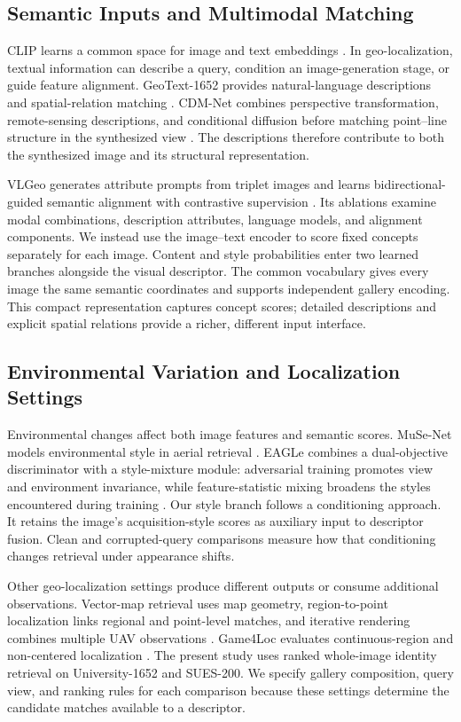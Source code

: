 \documentclass[journal]{IEEEtran}
\begin{document}
\subsection{Semantic Inputs and Multimodal Matching}

CLIP learns a common space for image and text embeddings \cite{clip2021}.
In geo-localization, textual information can describe a query, condition an
image-generation stage, or guide feature alignment. GeoText-1652 provides
natural-language descriptions and spatial-relation matching
\cite{geotext2024}. CDM-Net combines perspective transformation,
remote-sensing descriptions, and conditional diffusion before matching
point--line structure in the synthesized view \cite{cdmnet2025}. The
descriptions therefore contribute to both the synthesized image and its
structural representation.

VLGeo generates attribute prompts from triplet images and learns
bidirectional-guided semantic alignment with contrastive supervision
\cite{vlgeo2026}. Its ablations examine modal combinations, description
attributes, language models, and alignment components. We instead use the
image--text encoder to score fixed concepts separately for each image.
Content and style probabilities enter two learned branches alongside the
visual descriptor. The common vocabulary gives every image the same
semantic coordinates and supports independent gallery encoding. This
compact representation captures concept scores; detailed descriptions and
explicit spatial relations provide a richer, different input interface.

\subsection{Environmental Variation and Localization Settings}

Environmental changes affect both image features and semantic scores.
MuSe-Net models environmental style in aerial retrieval
\cite{musenet2024}. EAGLe combines a dual-objective discriminator with a
style-mixture module: adversarial training promotes view and environment
invariance, while feature-statistic mixing broadens the styles encountered
during training \cite{eagle2025}. Our style branch follows a conditioning
approach. It retains the image's acquisition-style scores as auxiliary input
to descriptor fusion. Clean and corrupted-query comparisons measure how
that conditioning changes retrieval under appearance shifts.

Other geo-localization settings produce different outputs or consume
additional observations. Vector-map retrieval uses map geometry,
region-to-point localization links regional and point-level matches, and
iterative rendering combines multiple UAV observations
\cite{vectormap2025,r2ploc2025,rendering2025}. Game4Loc evaluates
continuous-region and non-centered localization \cite{game4loc2025}. The
present study uses ranked whole-image identity retrieval on
University-1652 and SUES-200. We specify gallery composition, query view,
and ranking rules for each comparison because these settings determine the
candidate matches available to a descriptor.
\end{document}
